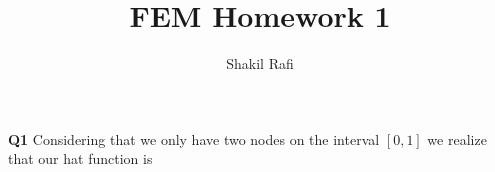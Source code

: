 \documentclass{article}
\title{FEM Homework 1}
\author{Shakil Rafi}
\begin{document}
\maketitle
\textbf{Q1} Considering that we only have two nodes on the interval $[0,1]$ we realize that our hat function is
\end{document}
